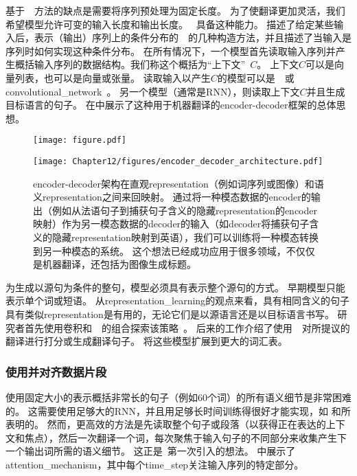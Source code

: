 基于~~方法的缺点是需要将序列预处理为固定长度。
为了使翻译更加灵活，我们希望模型允许可变的输入长度和输出长度。
~具备这种能力。
描述了给定某些输入后，表示（输出）序列上的条件分布的~~的几种构造方法，并且描述了当输入是序列时如何实现这种条件分布。
在所有情况下，一个模型首先读取输入序列并产生概括输入序列的数据结构。我们称这个概括为``上下文''~$C$。
上下文$C$可以是向量列表，也可以是向量或张量。
读取输入以产生$C$的模型可以是~~\citep{Cho-et-al-EMNLP2014,Sutskever-et-al-NIPS2014,Jean-et-al-arxiv2014}或\gls{convolutional_network}~\citep{Kalchbrenner+Blunsom-EMNLP2013}。
另一个模型（通常是RNN），则读取上下文$C$并且生成目标语言的句子。
在中展示了这种用于机器翻译的\gls{encoder}-\gls{decoder}框架的总体思想。


\begin{figure}[htp]
\ifOpenSource
\centerline{\texttt{[image: figure.pdf]}}
\else
\centerline{\texttt{[image: Chapter12/figures/encoder\_decoder\_architecture.pdf]}}
\fi
\caption{\gls{encoder}-\gls{decoder}架构在直观\gls{representation}（例如词序列或图像）和语义\gls{representation}之间来回映射。
通过将一种模态数据的\gls{encoder}的输出（例如从法语句子到捕获句子含义的隐藏\gls{representation}的\gls{encoder}映射）作为另一模态数据的\gls{decoder}的输入（如\gls{decoder}将捕获句子含义的隐藏\gls{representation}映射到英语），我们可以训练将一种模态转换到另一种模态的系统。
这个想法已经成功应用于很多领域，不仅仅是机器翻译，还包括为图像生成标题。
}
\label{fig:chap12_encoder_decoder_architecture}
\end{figure}

为生成以源句为条件的整句，模型必须具有表示整个源句的方式。 
早期模型只能表示单个词或短语。
从\gls{representation_learning}的观点来看，具有相同含义的句子具有类似\gls{representation}是有用的，无论它们是以源语言还是以目标语言书写。
研究者首先使用卷积和~~的组合探索该策略~\citep{Kalchbrenner+Blunsom-EMNLP2013}。
后来的工作介绍了使用~~对所提议的翻译进行打分\citep{Cho-et-al-EMNLP2014}或生成翻译句子\citep{Sutskever-et-al-NIPS2014}。
\cite{Jean-et-al-arxiv2014}将这些模型扩展到更大的词汇表。


\subsubsection{使用并对齐数据片段}
\label{sec:using_an_attention_mechanism_and_aligning_pieces_of_data}
使用固定大小的表示概括非常长的句子（例如60个词）的所有语义细节是非常困难的。 
这需要使用足够大的RNN，并且用足够长时间训练得很好才能实现，如 \citet{Cho-et-al-EMNLP2014}和\citet{Sutskever-et-al-NIPS2014}所表明的。
然而，更高效的方法是先读取整个句子或段落（以获得正在表达的上下文和焦点），然后一次翻译一个词，每次聚焦于输入句子的不同部分来收集产生下一个输出词所需的语义细节。
这正是~\citet{Bahdanau-et-al-ICLR2015-small}第一次引入的想法。
中展示了\gls{attention_mechanism}，其中每个\gls{time_step}关注输入序列的特定部分。

